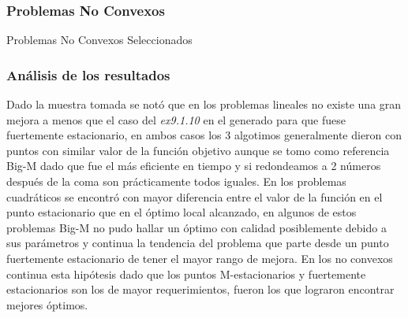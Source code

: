 \subsubsection{Problemas No Convexos}

\begin{resultstable}{Problemas No Convexos Seleccionados}
\end{resultstable}


\subsubsection{Análisis de los resultados}
Dado la muestra tomada se notó que en los problemas lineales no existe una gran mejora 
a menos que el caso del \textit{ex9.1.10} en el generado para que fuese fuertemente estacionario, en ambos casos los 3 algotimos generalmente dieron con puntos con similar valor de la función objetivo aunque 
se tomo como referencia Big-M dado que fue el más eficiente en tiempo y si redondeamos a 2 números después de la coma son prácticamente todos iguales.
En los problemas cuadráticos se encontró con mayor diferencia entre el valor de la función en el punto estacionario que en el óptimo local alcanzado, en algunos de estos problemas Big-M no pudo hallar un óptimo con calidad posiblemente debido a sus parámetros y continua la tendencia del
problema que parte desde un punto fuertemente estacionario de tener el mayor rango de mejora.
En los no convexos continua esta hipótesis dado que los puntos M-estacionarios y fuertemente estacionarios son los de mayor requerimientos, fueron los que lograron encontrar mejores óptimos. 
